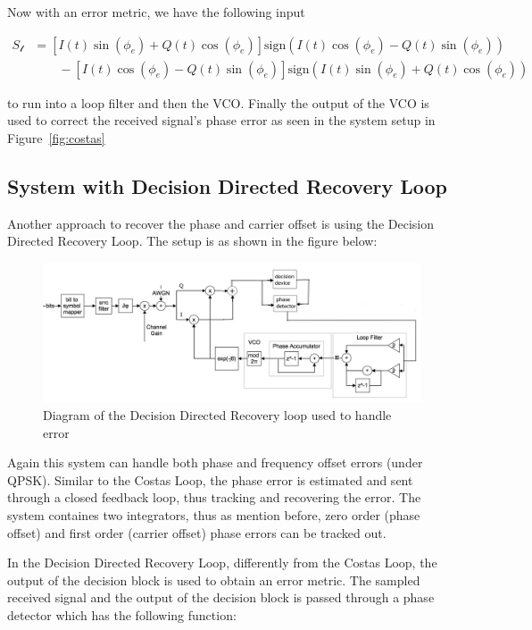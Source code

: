 \documentclass[]{article}
\begin{document}
Now with an error metric, we have the following input 

\begin{align}
  \label{eq:costas}
  S_{\mathcal{l}} &= \left[I\left(t\right)\sin\left(\phi_e\right)+Q\left(t\right)\cos\left(\phi_e\right)\right]\text{sign}\left(I\left(t\right)\cos\left(\phi_e\right)- Q\left(t\right)\sin\left(\phi_e\right)\right)\nonumber \\
  &\qquad {} - \left[I\left(t\right)\cos\left(\phi_e\right)-Q\left(t\right)\sin\left(\phi_e\right)\right]\text{sign}\left(I\left(t\right)\sin\left(\phi_e\right)+Q\left(t\right)\cos\left(\phi_e\right)\right)
  \end{align}


to run into a loop filter and then the VCO. Finally the output of the VCO is used to correct the received signal's phase error as seen in the system setup in Figure~\ref{fig:costas}

\newpage
\subsection{System with Decision Directed Recovery Loop}
Another approach to recover the phase and carrier offset is using the Decision Directed Recovery Loop. The setup is as shown in the figure below:
\begin{figure}[H]
\centering
\includegraphics[width=\textwidth]{ddr_diagram.jpg}
\caption{Diagram of the Decision Directed Recovery loop used to handle error\label{fig:ddr}}
\end{figure}

Again this system can handle both phase and frequency offset errors (under QPSK). Similar to the Costas Loop, the phase error is estimated and sent through a closed feedback loop, thus tracking and recovering the error. The system containes two integrators, thus as mention before, zero order (phase offset) and first order (carrier offset) phase errors can be tracked out. 

In the Decision Directed Recovery Loop, differently from the Costas Loop, the output of the decision block is used to obtain an error metric. The sampled received signal and the output of the decision block is passed through a phase detector which has the following function:\\
\end{document}
